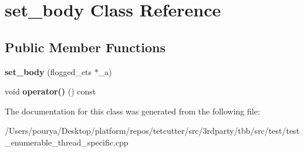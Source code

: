 \hypertarget{classset__body}{}\section{set\+\_\+body Class Reference}
\label{classset__body}
\subsection*{Public Member Functions}
\begin{DoxyCompactItemize}
\item 
\hypertarget{classset__body_a13dd6911acf8838a7001ed7e9a7139ce}{}{\bfseries set\+\_\+body} (flogged\+\_\+ets $\ast$\+\_\+a)\label{classset__body_a13dd6911acf8838a7001ed7e9a7139ce}

\item 
\hypertarget{classset__body_a52850c2839be0939da9be74b3b075faf}{}void {\bfseries operator()} () const \label{classset__body_a52850c2839be0939da9be74b3b075faf}

\end{DoxyCompactItemize}


The documentation for this class was generated from the following file\+:\begin{DoxyCompactItemize}
\item 
/\+Users/pourya/\+Desktop/platform/repos/tetcutter/src/3rdparty/tbb/src/test/test\+\_\+enumerable\+\_\+thread\+\_\+specific.\+cpp\end{DoxyCompactItemize}
